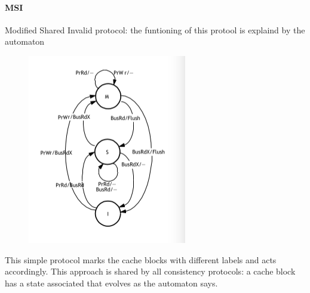 \documentclass[10pt,a4paper]{article}
\begin{document}
					\paragraph{MSI}
						Modified Shared Invalid protocol: the funtioning of this protool is explaind by the automaton
						\begin{figure}[H]
							\centering
							\includegraphics[width = \textwidth]{./images/MSI.png}
						\end{figure}
						This simple protocol marks the cache blocks with different labels and acts accordingly. This approach is shared by all consistency protocols: a cache block has a state associated that evolves as the automaton says.
						
\end{document}
